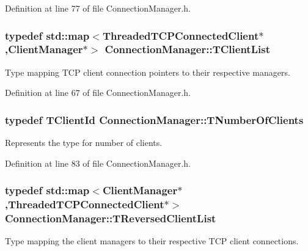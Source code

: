 Definition at line 77 of file Connection\-Manager.\-h.

\hypertarget{class_connection_manager_a7b6865543285e3b27b981a739fd0db18}{
\subsubsection[{T\-Client\-List}]{\setlength{\rightskip}{0pt plus 5cm}typedef std\-::map$<${\bf Threaded\-T\-C\-P\-Connected\-Client}$\ast$,{\bf Client\-Manager}$\ast$$>$ {\bf Connection\-Manager\-::\-T\-Client\-List}\hspace{0.3cm}{\ttfamily [private]}}}\label{class_connection_manager_a7b6865543285e3b27b981a739fd0db18}
Type mapping T\-C\-P client connection pointers to their respective managers. 

Definition at line 67 of file Connection\-Manager.\-h.

\hypertarget{class_connection_manager_a0f5f5b25b063cfebfac54b25cda131f7}{
\subsubsection[{T\-Number\-Of\-Clients}]{\setlength{\rightskip}{0pt plus 5cm}typedef {\bf T\-Client\-Id} {\bf Connection\-Manager\-::\-T\-Number\-Of\-Clients}}}\label{class_connection_manager_a0f5f5b25b063cfebfac54b25cda131f7}
Represents the type for number of clients. 

Definition at line 83 of file Connection\-Manager.\-h.

\hypertarget{class_connection_manager_aa35cf836145608197dbe4201b115991c}{
\subsubsection[{T\-Reversed\-Client\-List}]{\setlength{\rightskip}{0pt plus 5cm}typedef std\-::map$<${\bf Client\-Manager}$\ast$,{\bf Threaded\-T\-C\-P\-Connected\-Client}$\ast$$>$ {\bf Connection\-Manager\-::\-T\-Reversed\-Client\-List}\hspace{0.3cm}{\ttfamily [private]}}}\label{class_connection_manager_aa35cf836145608197dbe4201b115991c}
Type mapping the client managers to their respective T\-C\-P client connections. 

